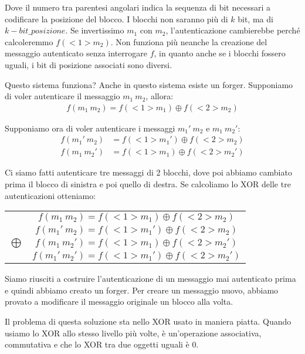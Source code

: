 \noindent Dove il numero tra parentesi angolari indica la sequenza di bit necessari a codificare la posizione del blocco. I blocchi non saranno più di $k$ bit, ma di $k - bit\_posizione$. Se invertissimo $m_1$ con $m_2$, l'autenticazione cambierebbe perché calcoleremmo $f(<1> m_2)$. Non funziona più neanche la creazione del messaggio autenticato senza interrogare $f$, in quanto anche se i blocchi fossero uguali, i bit di posizione associati sono diversi. 

Questo sistema funziona? Anche in questo sistema esiste un forger. Supponiamo di voler autenticare il messaggio $m_1 \ m_2$, allora:
\begin{align*}
    f(m_1 \ m_2) = f(<1> m_1) \oplus f(<2> m_2)
\end{align*}

\noindent Supponiamo ora di voler autenticare i messaggi $m_1' \ m_2$ e $m_1 \ m_2'$:
\begin{align*}
    f(m_1' \ m_2) &= f(<1> m_1') \oplus f(<2> m_2)\\
    f(m_1 \ m_2') &= f(<1> m_1) \oplus f(<2> m_2')
\end{align*}

\noindent Ci siamo fatti autenticare tre messaggi di 2 blocchi, dove poi abbiamo cambiato prima il blocco di sinistra e poi quello di destra. Se calcoliamo lo XOR delle tre autenticazioni otteniamo:
\begin{center}
    {\tabulinesep=1.2mm
       \begin{tabu} {c c}
        & $f(m_1 \ m_2) = f(<1> m_1) \oplus f(<2> m_2)$\\
        & $f(m_1' \ m_2) = f(<1> m_1') \oplus f(<2> m_2)$ \\
        $\bigoplus$ & $f(m_1 \ m_2') = f(<1> m_1) \oplus f(<2> m_2')$\\
        \hline 
        & $f(m_1' \ m_2') = f(<1> m_1') \oplus f(<2> m_2')$\\
    \end{tabu}}
\end{center}

\noindent Siamo riusciti a costruire l'autenticazione di un messaggio mai autenticato prima e quindi abbiamo creato un forger. Per creare un messaggio nuovo, abbiamo provato a modificare il messaggio originale un blocco alla volta.

Il problema di questa soluzione sta nello XOR usato in maniera piatta. Quando usiamo lo XOR allo stesso livello più volte, è un'operazione associativa, commutativa e che lo XOR tra due oggetti uguali è $0$. \\

